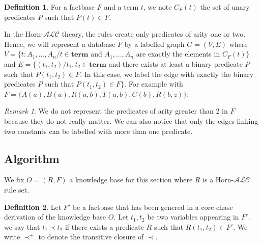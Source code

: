 \documentclass{article}
\theoremstyle{definition}
\newtheorem{definition}{Definition}[section]
\theoremstyle{remark}
\newtheorem{remark}{Remark}[section]
\begin{document}
\begin{definition}
For a factbase $F$ and a term $t$, we note $C_F(t)$ the set of unary predicates $P$ such that $P(t)\in F$.
\end{definition}

In the Horn-$\mathcal{ALC}$ theory, the rules create only predicates of arity one or two.
Hence, we will represent a database $F$ by a labelled graph $G = (V,E)$ where $V = \{t:A_1,...,A_n /t \in \textbf{term}$ and $A_1,...,A_n$ are exactly the elements in $C_F(t)\}$ and $E = \{(t_1,t_2) /t_1,t_2 \in \textbf{term}$ and there exists at least a binary predicate $P$ such that $P(t_1,t_2) \in F$. In this case, we label the edge with exactly the binary predicates $P$ such that $P(t_1,t_2) \in F\}$. For example with $F = \{A(a), B(a),R(a,b),T(a,b),C(b),R(b,z)\}$: \\


\begin{remark}
We do not represent the predicates of arity greater than 2 in $F$ because they do not really matter. We can also notice that only the edges linking two constants can be labelled with more than one predicate.
\end{remark}


\subsection{Algorithm}
We fix $O=(R,F)$ a knowledge base for this section where $R$ is a Horn-$\mathcal{ALC}$ rule set.

\begin{definition}
Let $F'$ be a factbase that has been genered in a core chase derivation of the knowledge base $O$. Let $t_1,t_2$ be two variables appearing in $F'$. we say that $t_1 \prec t_2$ if there exists a predicate $R$ such that $R(t_1,t_2) \in F'$. We write $\prec^+$ to denote the transitive closure of $\prec$.
\end{definition}
\end{document}
